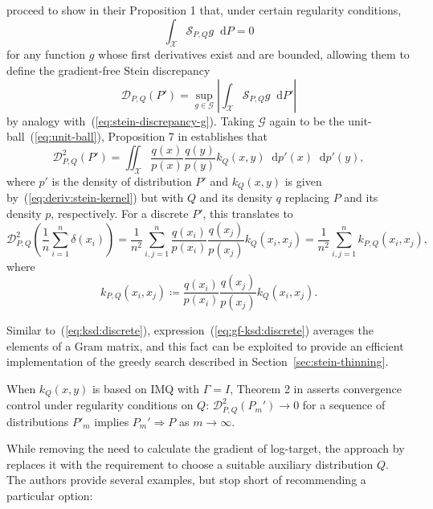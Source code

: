 \documentclass[11pt,a4paper]{report}
\newcommand*\diff{\mathop{}\!\mathrm{d}}
\begin{document}
\cite{fisherGradientFreeKernelStein2024} proceed to show in their Proposition 1 that, under certain regularity conditions,
\begin{equation*}
\int_\mathcal{X} \mathcal{S}_{P,Q} g \diff P = 0
\end{equation*}
for any function $g$ whose first derivatives exist and are bounded, allowing them to define the gradient-free Stein discrepancy
\begin{equation*}
\mathcal{D}_{P, Q}(P') = \sup_{g \in \mathcal{G}}\left|\int_\mathcal{X} \mathcal{S}_{P,Q} g \diff P' \right|
\end{equation*}
by analogy with~(\ref{eq:stein-discrepancy-g}). Taking $\mathcal{G}$ again to be the unit-ball~(\ref{eq:unit-ball}), Proposition 7 in \cite{fisherGradientFreeKernelStein2024} establishes that
\begin{equation*}
\mathcal{D}_{P, Q}^2(P') = \iint_\mathcal{X} \frac{q(x)}{p(x)} \frac{q(y)}{p(y)} k_Q(x, y) \diff p'(x) \diff p'(y),
\label{eq:gf-ksd:int}
\end{equation*}
where $p'$ is the density of distribution $P'$ and $k_Q(x, y)$ is given by~(\ref{eq:deriv:stein-kernel}) but with $Q$ and its density $q$ replacing $P$ and its density $p$, respectively. For a discrete $P'$, this translates to
\begin{equation}
\mathcal{D}_{P, Q}^2\left(\frac{1}{n} \sum_{i=1}^n \delta(x_i)\right) 
= \frac{1}{n^2} \sum_{i,j=1}^n \frac{q(x_i)}{p(x_i)} \frac{q(x_j)}{p(x_j)} k_Q(x_i, x_j)
= \frac{1}{n^2} \sum_{i,j=1}^n k_{P,Q}(x_i, x_j),
\label{eq:gf-ksd:discrete}
\end{equation}
where
\begin{equation*}
k_{P,Q}(x_i, x_j) \coloneq \frac{q(x_i)}{p(x_i)} \frac{q(x_j)}{p(x_j)} k_Q(x_i, x_j).
\end{equation*}

Similar to~(\ref{eq:ksd:discrete}), expression~(\ref{eq:gf-ksd:discrete}) averages the elements of a Gram matrix, and this fact can be exploited to provide an efficient implementation of the greedy search described in Section~\ref{sec:stein-thinning}.

When $k_Q(x,y)$ is based on IMQ with $\Gamma = I$, Theorem 2 in \cite{fisherGradientFreeKernelStein2024} asserts convergence control under regularity conditions on $Q$: $\mathcal{D}_{P, Q}^2(P_m') \to 0$ for a sequence of distributions $P'_m$ implies $P_m' \Rightarrow P$ as $m \to \infty$. 

While removing the need to calculate the gradient of log-target, the approach by \cite{fisherGradientFreeKernelStein2024} replaces it with the requirement to choose a suitable auxiliary distribution $Q$. The authors provide several examples, but stop short of recommending a particular option:
\end{document}
